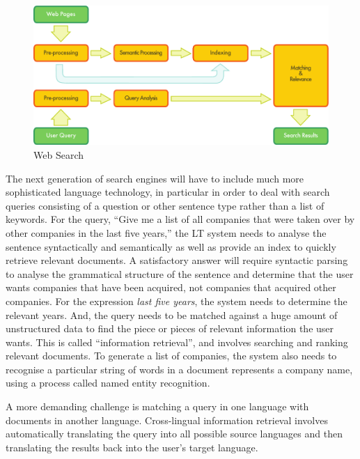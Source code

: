 \begin{multicols}{2}
\begin{figure}[htb]
  \center
  \includegraphics[width=\textwidth]{../_media/english/web_search_architecture}
  \caption{Web Search}
\label{fig:websearcharch_en}
 \end{figure}


The next generation of search engines will have to include much more sophisticated language technology, in particular in order to deal with search queries consisting of a question or other sentence type rather than a list of keywords. For the query, ``Give me a list of all companies that were taken over by other companies in the last five years,'' the LT system needs to analyse the sentence syntactically and semantically as well as provide an index to quickly retrieve relevant documents. A satisfactory answer will require syntactic parsing to analyse the grammatical structure of the sentence and determine that the user wants companies that have been acquired, not companies that acquired other companies. For the expression \textit{last five years}, the system needs to determine the relevant years. And, the query needs to be matched against a huge amount of unstructured data to find the piece or pieces of relevant information the user wants. This is called ``information retrieval'', and involves searching and ranking relevant documents. To generate a list of companies, the system also needs to recognise a particular string of words in a document represents a company name, using a process called named entity recognition.

A more demanding challenge is matching a query in one language with documents in another language. Cross-lingual information retrieval involves automatically translating the query into all possible source languages and then translating the results back into the user's target language.


\end{multicols}
